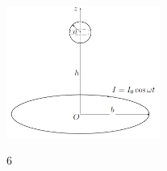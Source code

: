 \begin{figure}
  \centering
  \vspace{-30px}
  \includegraphics[width=0.45\textwidth]{images/Hinh 6.PNG}
  \vspace{-20px}
  \begin{center}
    \figurename{ 6}
  \end{center}
\end{figure}

